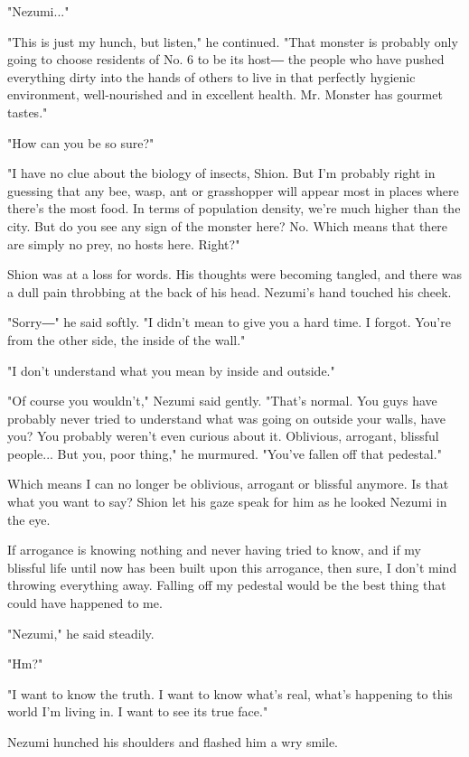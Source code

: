 "Nezumi..."

"This is just my hunch, but listen," he continued. "That monster is
probably only going to choose residents of No. 6 to be its host― the
people who have pushed everything dirty into the hands of others to live
in that perfectly hygienic environment, well-nourished and in excellent
health. Mr. Monster has gourmet tastes."

"How can you be so sure?"

"I have no clue about the biology of insects, Shion. But I'm probably
right in guessing that any bee, wasp, ant or grasshopper will appear
most in places where there's the most food. In terms of population
density, we're much higher than the city. But do you see any sign of the
monster here? No. Which means that there are simply no prey, no hosts
here. Right?"

Shion was at a loss for words. His thoughts were becoming tangled, and
there was a dull pain throbbing at the back of his head. Nezumi's hand
touched his cheek.

"Sorry―" he said softly. "I didn't mean to give you a hard time. I
forgot. You're from the other side, the inside of the wall."

"I don't understand what you mean by inside and outside."

"Of course you wouldn't," Nezumi said gently. "That's normal. You guys
have probably never tried to understand what was going on outside your
walls, have you? You probably weren't even curious about it. Oblivious,
arrogant, blissful people... But you, poor thing," he murmured. "You've
fallen off that pedestal."

Which means I can no longer be oblivious, arrogant or blissful anymore.
Is that what you want to say? Shion let his gaze speak for him as he
looked Nezumi in the eye.

If arrogance is knowing nothing and never having tried to know, and if
my blissful life until now has been built upon this arrogance, then
sure, I don't mind throwing everything away. Falling off my pedestal
would be the best thing that could have happened to me.

"Nezumi," he said steadily.

"Hm?"

"I want to know the truth. I want to know what's real, what's happening
to this world I'm living in. I want to see its true face."

Nezumi hunched his shoulders and flashed him a wry smile.

